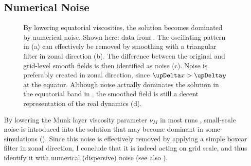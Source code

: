 \subsection{Numerical Noise}
\label{sec:cesm-noise}
%
\begin{figure}
	\centering
	\caption[The generation of numerical noise at the equator in low viscosity \acs{CESM} experiments.]{By lowering equatorial viscosities, the solution becomes dominated by numerical noise. Shown here: data from . The oscillating pattern in (a) can effectively be removed by smoothing with a triangular filter in zonal direction (b). The difference between the original and grid-level smooth fields is then identified as noise (c). Noise is preferably created in zonal direction, since \(\updel x > \updel y\) at the equator. Although noise actually dominates the solution in the equatorial band in , the smoothed field is still a decent representation of the real dynamics (d).}
	\label{fig:noise}
\end{figure}%
%
By lowering the Munk layer viscosity parameter \(\nu_M\) in most runs%
, small-scale noise is introduced into the solution that may become dominant in some simulations (). Since this noise is effectively removed by applying a simple boxcar filter in zonal direction, I conclude that it is indeed acting on grid scale, and thus identify it with numerical (dispersive) noise (see also ).

